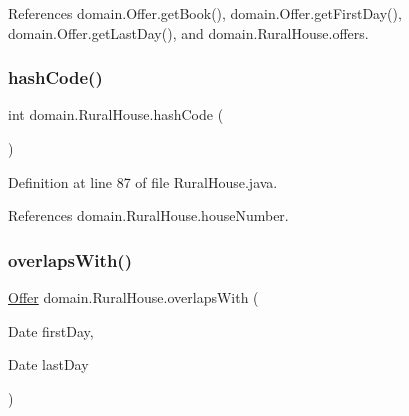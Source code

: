 References domain.\+Offer.\+get\+Book(), domain.\+Offer.\+get\+First\+Day(), domain.\+Offer.\+get\+Last\+Day(), and domain.\+Rural\+House.\+offers.

\mbox{\label{classdomain_1_1RuralHouse_a23272d170821f464d6b07595303c283e}} 
\subsubsection{\texorpdfstring{hashCode()}{hashCode()}}
{\footnotesize\ttfamily int domain.\+Rural\+House.\+hash\+Code (\begin{DoxyParamCaption}{ }\end{DoxyParamCaption})}



Definition at line 87 of file Rural\+House.\+java.


\begin{DoxyCode}{0}

\end{DoxyCode}


References domain.\+Rural\+House.\+house\+Number.

\mbox{\label{classdomain_1_1RuralHouse_ac5596b06728d8bf377993088520fbc9e}} 
\subsubsection{\texorpdfstring{overlapsWith()}{overlapsWith()}}
{\footnotesize\ttfamily \mbox{\hyperlink{classdomain_1_1Offer}{Offer}} domain.\+Rural\+House.\+overlaps\+With (\begin{DoxyParamCaption}\item[{Date}]{first\+Day,  }\item[{Date}]{last\+Day }\end{DoxyParamCaption})}



